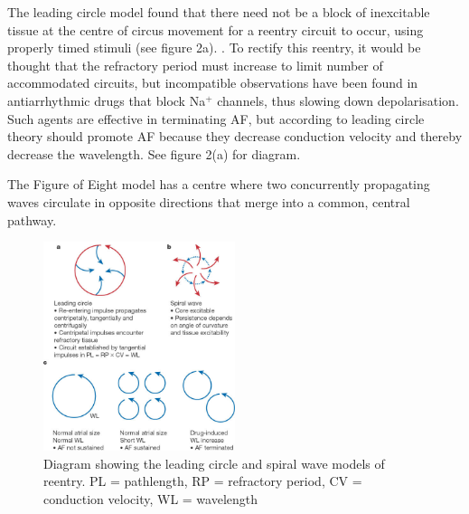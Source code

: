 \documentclass[twocolumn]{article}
\begin{document}
The leading circle model found that there need not be a block of inexcitable tissue at the centre of circus movement for a reentry circuit to occur, using properly timed stimuli (see figure 2a). \cite{Allessie}. %
 To rectify this reentry, it would be thought that the refractory period must increase to limit number of accommodated circuits, but incompatible observations have been found in antiarrhythmic drugs that block Na$^{+}$ channels, thus slowing down depolarisation. Such agents are effective in terminating AF, but according to leading circle theory should promote AF because they decrease conduction velocity and thereby decrease the wavelength. See figure 2(a) for diagram. 

The Figure of Eight model has a centre where two concurrently propagating waves circulate in opposite directions that merge into a common, central pathway. 

\begin{figure}
\caption[short title]{Diagram showing the leading circle and spiral wave models of reentry. PL = pathlength, RP = refractory period, CV = conduction velocity, WL = wavelength \cite{Nattel3}}
\centering
\includegraphics[width = 0.5\textwidth]{reeentry}
\end{figure}
\end{document}
